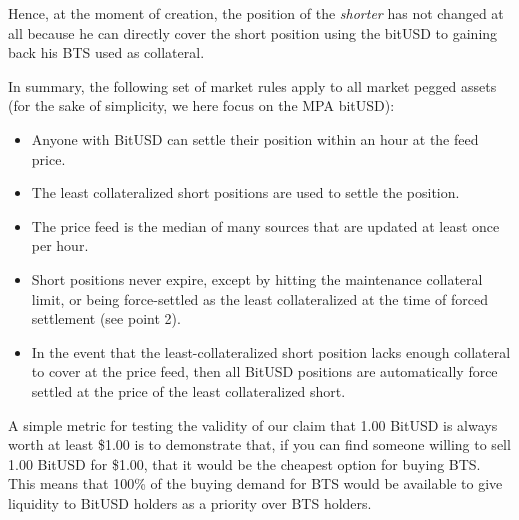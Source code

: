 Hence, at the moment of creation, the position of the \emph{shorter} has not
changed at all because he can directly cover the short position using the
bitUSD to gaining back his BTS used as collateral.

In summary, the following set of market rules apply to all market pegged assets
(for the sake of simplicity, we here focus on the MPA bitUSD):
\begin{itemize}
 \item Anyone with BitUSD can settle their position within an hour at the feed
       price.
 \item The least collateralized short positions are used to settle the
       position.
 \item The price feed is the median of many sources that are updated at least
       once per hour.
 \item Short positions never expire, except by hitting the maintenance
       collateral limit, or being force-settled as the least collateralized at the
       time of forced settlement (see point 2).
 \item In the event that the least-collateralized short position lacks enough
       collateral to cover at the price feed, then all BitUSD positions are
       automatically force settled at the price of the least collateralized short.
\end{itemize}

A simple metric for testing the validity of our claim that 1.00 BitUSD is
always worth at least \$1.00 is to demonstrate that, if you can find someone
willing to sell 1.00 BitUSD for \$1.00, that it would be the cheapest option for
buying BTS. This means that 100\% of the buying demand for BTS would be
available to give liquidity to BitUSD holders as a priority over BTS holders.
